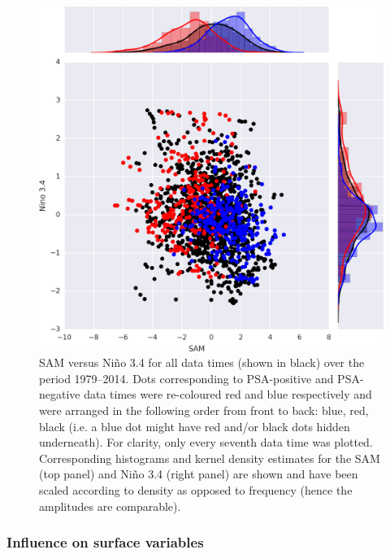 \begin{figure}
\begin{center}
\includegraphics[width=0.8\columnwidth]{figures/psa/nino34-vs-sam_psa-phases_ERAInterim_surface_030day-runmean_native.png}
\caption[SAM versus Ni\~{n}o 3.4 for various temporal subsets]{\label{fig:sam_v_enso}
SAM versus Ni\~{n}o 3.4 for all data times (shown in black) over the period 1979--2014. Dots corresponding to PSA-positive and PSA-negative data times were re-coloured red and blue respectively and were arranged in the following order from front to back: blue, red, black (i.e. a blue dot might have red and/or black dots hidden underneath). For clarity, only every seventh data time was plotted. Corresponding histograms and kernel density estimates for the SAM (top panel) and Ni\~{n}o 3.4 (right panel) are shown and have been scaled according to density as opposed to frequency (hence the amplitudes are comparable).%
}
\end{center}
\end{figure}

\subsubsection{Influence on surface variables} 

